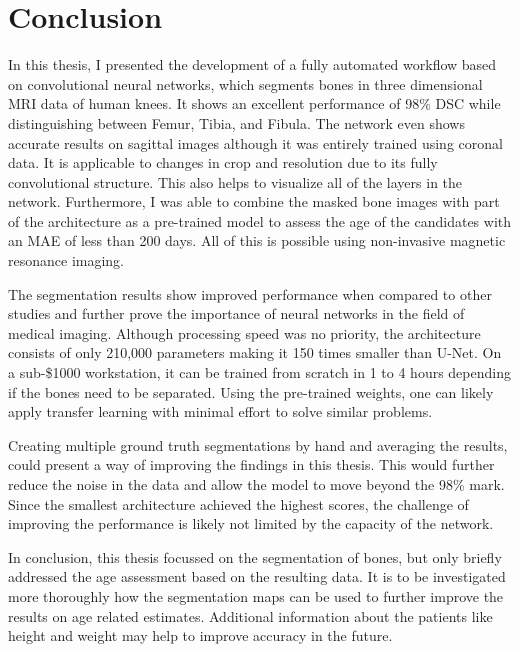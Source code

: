 \section{Conclusion}

In this thesis, I presented the development of a fully automated workflow based on convolutional neural networks, which segments bones in three dimensional MRI data of human knees. It shows an excellent performance of 98\% DSC while distinguishing between Femur, Tibia, and Fibula. The network even shows accurate results on sagittal images although it was entirely trained using coronal data. It is applicable to changes in crop and resolution due to its fully convolutional structure. This also helps to visualize all of the layers in the network. Furthermore, I was able to combine the masked bone images with part of the architecture as a pre-trained model to assess the age of the candidates with an MAE of less than 200 days. All of this is possible using non-invasive magnetic resonance imaging.

The segmentation results show improved performance when compared to other studies and further prove the importance of neural networks in the field of medical imaging. Although processing speed was no priority, the architecture consists of only 210,000 parameters making it 150 times smaller than U-Net. On a sub-\$1000 workstation, it can be trained from scratch in 1 to 4 hours depending if the bones need to be separated. Using the pre-trained weights, one can likely apply transfer learning with minimal effort to solve similar problems.

Creating multiple ground truth segmentations by hand and averaging the results, could present a way of improving the findings in this thesis. This would further reduce the noise in the data and allow the model to move beyond the 98\% mark. Since the smallest architecture achieved the highest scores, the challenge of improving the performance is likely not limited by the capacity of the network.

In conclusion, this thesis focussed on the segmentation of bones, but only briefly addressed the age assessment based on the resulting data. It is to be investigated more thoroughly how the segmentation maps can be used to further improve the results on age related estimates. Additional information about the patients like height and weight may help to improve accuracy in the future.

\newpage
